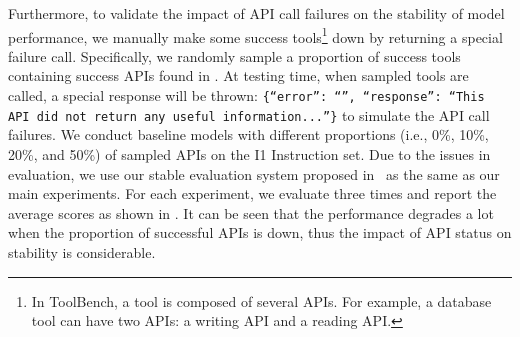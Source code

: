 Furthermore, to validate the impact of API call failures on the stability of model performance, we manually make some success tools\footnote{In ToolBench, a tool is composed of several APIs. For example, a database tool can have two APIs: a writing API and a reading API. } down by returning a special failure call. Specifically, we randomly sample a proportion of success tools containing success APIs found in .
At testing time, when sampled tools are called, a special response will be thrown: \texttt{\{``error'': ``'', ``response'': ``This API did not return any useful information...''\}} to simulate the API call failures. 
We conduct baseline models with different proportions (i.e., 0\%, 10\%, 20\%, and 50\%) of sampled APIs on the I1 Instruction set.
Due to the issues in evaluation, we use our stable evaluation system proposed in~ as the same as our main experiments.
For each experiment, we evaluate three times and report the average scores as shown in .
It can be seen that the performance degrades a lot when the proportion of successful APIs is down, thus the impact of API status on stability is considerable.




